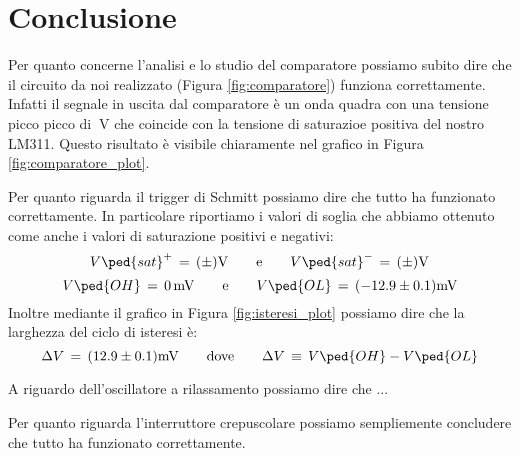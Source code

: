 \section*{Conclusione}

Per quanto concerne l'analisi e lo studio del comparatore possiamo subito dire che il circuito da noi realizzato (Figura \ref{fig:comparatore}) funziona correttamente. Infatti il segnale in uscita dal comparatore è un onda quadra con una tensione picco picco di $\SI{}{\volt}$ che coincide con la tensione di saturazioe positiva del nostro LM311. Questo risultato è visibile chiaramente nel grafico in Figura \ref{fig:comparatore_plot}.

Per quanto riguarda il trigger di Schmitt possiamo dire che tutto ha funzionato correttamente. In particolare riportiamo i valori di soglia che abbiamo ottenuto come anche i valori di saturazione positivi e negativi:
\begin{equation}
        V\ped{sat}^+\,=\,(\pm)\SI{}{\volt} \qquad \text{e} \qquad V\ped{sat}^-\,=\,(\pm)\SI{}{\volt}
\end{equation}
\begin{equation}
        V\ped{OH}\,=\,\SI{0}{\milli\volt} \qquad \text{e} \qquad V\ped{OL}\,=\,(-12.9\pm0.1)\SI{}{\milli\volt}
\end{equation}
Inoltre mediante il grafico in Figura \ref{fig:isteresi_plot} possiamo dire che la larghezza del ciclo di isteresi è:
\begin{equation}
        \Delta V \,=\,(12.9\pm0.1)\SI{}{\milli\volt} \qquad \text{dove} \qquad \Delta V \,\equiv\, V\ped{OH} - V\ped{OL} 
\end{equation}

A riguardo dell'oscillatore a rilassamento possiamo dire che ...

Per quanto riguarda l'interruttore crepuscolare possiamo sempliemente concludere che tutto ha funzionato correttamente.
